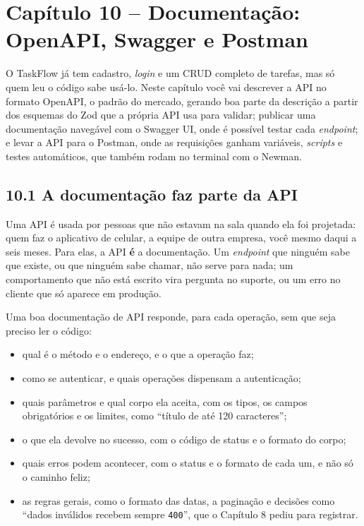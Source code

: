 \section{Capítulo 10 -- Documentação: OpenAPI, Swagger e Postman}

O TaskFlow já tem cadastro, \textit{login} e um CRUD completo de tarefas, mas só quem leu o código sabe usá-lo. Neste capítulo você vai descrever a API no formato OpenAPI, o padrão do mercado, gerando boa parte da descrição a partir dos esquemas do Zod que a própria API usa para validar; publicar uma documentação navegável com o Swagger UI, onde é possível testar cada \textit{endpoint}; e levar a API para o Postman, onde as requisições ganham variáveis, \textit{scripts} e testes automáticos, que também rodam no terminal com o Newman.

\subsection{10.1 A documentação faz parte da API}

Uma API é usada por pessoas que não estavam na sala quando ela foi projetada: quem faz o aplicativo de celular, a equipe de outra empresa, você mesmo daqui a seis meses. Para elas, a API \textbf{é} a documentação. Um \textit{endpoint} que ninguém sabe que existe, ou que ninguém sabe chamar, não serve para nada; um comportamento que não está escrito vira pergunta no suporte, ou um erro no cliente que só aparece em produção.

Uma boa documentação de API responde, para cada operação, sem que seja preciso ler o código:

\begin{itemize}
  \item qual é o método e o endereço, e o que a operação faz;
  \item como se autenticar, e quais operações dispensam a autenticação;
  \item quais parâmetros e qual corpo ela aceita, com os tipos, os campos obrigatórios e os limites, como ``título de até 120 caracteres'';
  \item o que ela devolve no sucesso, com o código de status e o formato do corpo;
  \item quais erros podem acontecer, com o status e o formato de cada um, e não só o caminho feliz;
  \item as regras gerais, como o formato das datas, a paginação e decisões como ``dados inválidos recebem sempre \texttt{400}'', que o Capítulo 8 pediu para registrar.
\end{itemize}

